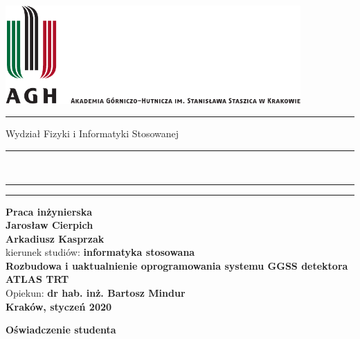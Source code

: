 \documentclass[11pt]{aghdpl}
\author{Jarosław Cierpich \and Arkadiusz Kasprzak}
\date{2019/2020}
\begin{document}

\thispagestyle{empty}

\includegraphics[height=37.5mm]{res/agh_nzw_a_pl_1w_wbr_cmyk.pdf}\\
\rule{30mm}{0pt}
{\Large\textsf{Wydział Fizyki i Informatyki Stosowanej}}\\
\rule{\textwidth}{3pt}\\
\rule[2.75ex]
{\textwidth}{1pt}%
\vspace{1em}\rule{30mm}{0pt}
\begin{center}
    {\bf\LARGE\textsf{Praca inżynierska}}\\
    \vspace{13ex}
    {\bf\Large\textsf{Jarosław Cierpich \\ Arkadiusz Kasprzak}}\\
    \vspace{3ex}
    {\sf \small kierunek studiów:} {\bf\small\textsf{informatyka stosowana}}\\
    \vspace{15ex}
    {\bf\huge\textsf{Rozbudowa i uaktualnienie oprogramowania systemu GGSS detektora ATLAS TRT}}\\
    \vspace{14ex}
    {\sf \Large Opiekun:} {\bf\Large\textsf{dr hab. inż. Bartosz Mindur}}\\
    \vspace{22ex}
    \textsf{\bf\large\textsf{Kraków, styczeń 2020}}
\end{center}

\newpage

\begin{center}
	{\bf\large\textsf{Oświadczenie studenta}}
\end{center}
\end{document}

